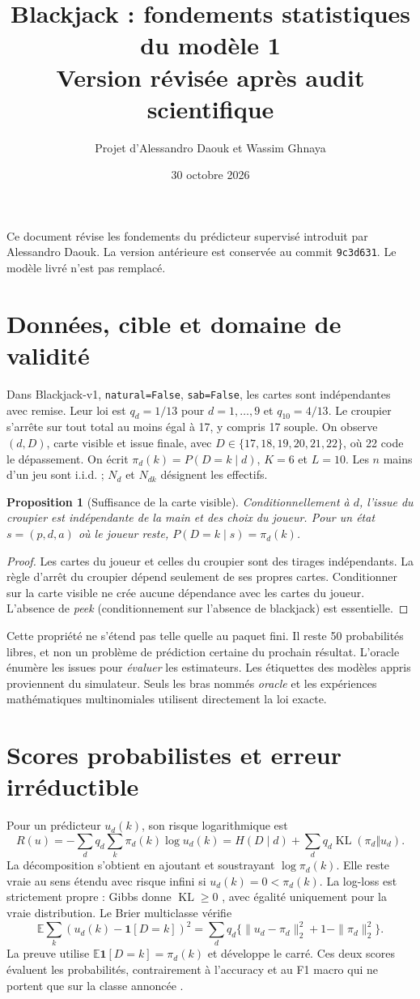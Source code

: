 \documentclass[11pt,a4paper]{article}
\title{Blackjack : fondements statistiques du modèle 1\\\large Version révisée après audit scientifique}
\author{Projet d'Alessandro Daouk et Wassim Ghnaya}
\date{30 octobre 2026}
\newtheorem{proposition}{Proposition}
\theoremstyle{remark}\newtheorem*{remarque}{Remarque}
\newcommand{\E}{\mathbb E}
\newcommand{\KL}{\operatorname{KL}}
\newcommand{\1}{\mathbf 1}
\begin{document}
\maketitle
\noindent Ce document révise les fondements du prédicteur supervisé introduit par
Alessandro Daouk. La version antérieure est conservée au commit \texttt{9c3d631}.
Le modèle livré n'est pas remplacé.
\tableofcontents

\section{Données, cible et domaine de validité}
Dans Blackjack-v1, \texttt{natural=False}, \texttt{sab=False}, les cartes sont
indépendantes avec remise. Leur loi est $q_d=1/13$ pour $d=1,\ldots,9$ et
$q_{10}=4/13$. Le croupier s'arrête sur tout total au moins égal à 17,
y compris 17 souple. On observe $(d,D)$, carte visible et issue finale, avec
$D\in\{17,18,19,20,21,22\}$, où 22 code le dépassement.
On écrit $\pi_d(k)=P(D=k\mid d)$, $K=6$ et $L=10$.
Les $n$ mains d'un jeu sont i.i.d. ; $N_d$ et $N_{dk}$ désignent les effectifs.

\begin{proposition}[Suffisance de la carte visible]
Conditionnellement à $d$, l'issue du croupier est indépendante de la main et des
choix du joueur. Pour un état $s=(p,d,a)$ où le joueur reste,
$P(D=k\mid s)=\pi_d(k)$.
\end{proposition}
\begin{proof}
Les cartes du joueur et celles du croupier sont des tirages indépendants. La règle
d'arrêt du croupier dépend seulement de ses propres cartes. Conditionner sur la
carte visible ne crée aucune dépendance avec les cartes du joueur. L'absence de
\emph{peek} (conditionnement sur l'absence de blackjack) est essentielle.
\end{proof}
Cette propriété ne s'étend pas telle quelle au paquet fini. Il reste 50 probabilités
libres, et non un problème de prédiction certaine du prochain résultat.
L'oracle énumère les issues pour \emph{évaluer} les estimateurs. Les étiquettes
des modèles appris proviennent du simulateur. Seuls les bras nommés \emph{oracle}
et les expériences mathématiques multinomiales utilisent directement la loi exacte.

\section{Scores probabilistes et erreur irréductible}
Pour un prédicteur $u_d(k)$, son risque logarithmique est
\[
 R(u)=-\sum_d q_d\sum_k\pi_d(k)\log u_d(k)
 =H(D\mid d)+\sum_d q_d\KL(\pi_d\Vert u_d).
\]
La décomposition s'obtient en ajoutant et soustrayant $\log\pi_d(k)$.
Elle reste vraie au sens étendu avec risque infini si $u_d(k)=0<\pi_d(k)$.
La log-loss est strictement propre : Gibbs donne $\KL\ge0$ \cite{cover}, avec égalité
uniquement pour la vraie distribution. Le Brier multiclasse vérifie
\[
 \E\sum_k(u_d(k)-\1[D=k])^2
 =\sum_d q_d\{\|u_d-\pi_d\|_2^2+1-\|\pi_d\|_2^2\}.
\]
La preuve utilise $\E\1[D=k]=\pi_d(k)$ et développe le carré.
Ces deux scores évaluent les probabilités, contrairement à l'accuracy et au F1
macro qui ne portent que sur la classe annoncée \cite{gneiting}.
\end{document}
